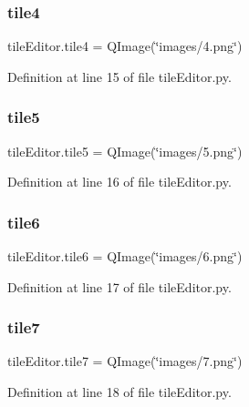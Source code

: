 \subsubsection{\texorpdfstring{tile4}{tile4}}
{\footnotesize\ttfamily tile\+Editor.\+tile4 = Q\+Image(\char`\"{}images/4.png\char`\"{})}



Definition at line 15 of file tile\+Editor.\+py.

\mbox{\label{namespacetile_editor_aa8f51dc2d83f2979ec5b3af33ed8b653}} 
\subsubsection{\texorpdfstring{tile5}{tile5}}
{\footnotesize\ttfamily tile\+Editor.\+tile5 = Q\+Image(\char`\"{}images/5.png\char`\"{})}



Definition at line 16 of file tile\+Editor.\+py.

\mbox{\label{namespacetile_editor_a3f59cccf038a57b3256626054cec5096}} 
\subsubsection{\texorpdfstring{tile6}{tile6}}
{\footnotesize\ttfamily tile\+Editor.\+tile6 = Q\+Image(\char`\"{}images/6.png\char`\"{})}



Definition at line 17 of file tile\+Editor.\+py.

\mbox{\label{namespacetile_editor_a1712ef4dbe11bfbb34f9e497664ad155}} 
\subsubsection{\texorpdfstring{tile7}{tile7}}
{\footnotesize\ttfamily tile\+Editor.\+tile7 = Q\+Image(\char`\"{}images/7.png\char`\"{})}



Definition at line 18 of file tile\+Editor.\+py.

\mbox{\label{namespacetile_editor_a3ec756360968240f64b4783e696bfbca}} 
